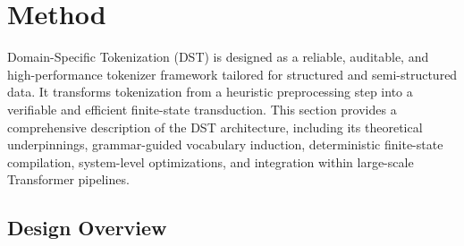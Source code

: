 \section{Method}
\label{sec:method}

Domain-Specific Tokenization (DST) is designed as a reliable, auditable, and high-performance tokenizer framework tailored for structured and semi-structured data.
It transforms tokenization from a heuristic preprocessing step into a verifiable and efficient finite-state transduction.
This section provides a comprehensive description of the DST architecture, including its theoretical underpinnings, grammar-guided vocabulary induction, deterministic finite-state compilation, system-level optimizations, and integration within large-scale Transformer pipelines.

\subsection{Design Overview}
